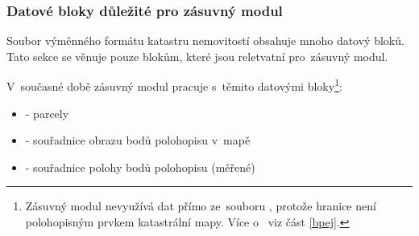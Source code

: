 \subsubsection{Datové bloky důležité pro zásuvný modul}
\label{datove_bloky_zasuvny_modul}

Soubor výměnného formátu katastru nemovitostí obsahuje mnoho datový bloků. Tato sekce se věnuje pouze blokům, které jsou reletvatní pro~zásuvný modul.

V~současné době zásuvný modul pracuje s~těmito datovými bloky\footnote{Zásuvný modul nevyužívá dat  přímo ze~souboru , protože hranice  není polohopisným prvkem katastrální mapy. Více o~ viz část \ref{bpej}.}:

	\begin{itemize}[leftmargin=1.5cm, noitemsep]
		\item \texttt{} - parcely
		\item \texttt{} - souřadnice obrazu bodů polohopisu v~mapě
		\item \texttt{} - souřadnice polohy bodů polohopisu (měřené)
	\end{itemize}

